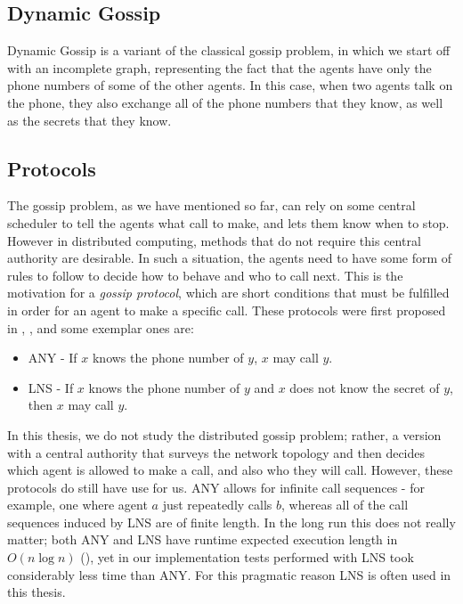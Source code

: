 \documentclass[10pt, a4paper]{report}
\begin{document}
\subsection{Dynamic Gossip}

Dynamic Gossip is a variant of the classical gossip problem, in which we start
off with an incomplete graph, representing the fact that the agents have only
the phone numbers of some of the other agents. In this case, when two agents
talk on the phone, they also exchange all of the phone numbers that they know, as
well as the secrets that they know.

\subsection{Protocols}
\label{sec:Protocols}

The gossip problem, as we have mentioned so far, can rely on some central
scheduler to tell the agents what call to make, and lets them know when to stop.
However in distributed computing, methods that do not require this central
authority are desirable. In such a situation, the agents need to have some form
of rules to follow to decide how to behave and who to call next. This is the
motivation for a \emph{gossip protocol}, which are short conditions that must
be fulfilled in order for an agent to make a specific call. These protocols were
first proposed in \cite{EPfDG}, \cite{KnowledgeandGossip}, and some exemplar
ones are:

\begin{itemize}
\item \textsf{ANY} - If $x$ knows the phone number of $y$, $x$ may call $y$.
\item \textsf{LNS} - If $x$ knows the phone number of $y$ and $x$ does not
    know the secret of $y$, then $x$ may call $y$.
\end{itemize}

In this thesis, we do not study the distributed gossip problem; rather, a
version with a central authority that surveys the network topology and then
decides which agent is allowed to make a call, and also who they will call.
However, these protocols do still have use for us. \textsf{ANY} allows for
infinite call sequences - for example, one where agent $a$ just repeatedly calls
$b$, whereas all of the call sequences induced by \textsf{LNS} are of finite
length. In the long run this does not really matter; both \textsf{ANY} and
\textsf{LNS} have runtime expected execution length in $O(n \log n)$
(\cite{DynamicGossip}), yet in our implementation tests performed with
\textsf{LNS} took considerably less time than \textsf{ANY}. For this pragmatic
reason \textsf{LNS} is often used in this thesis.
\end{document}
